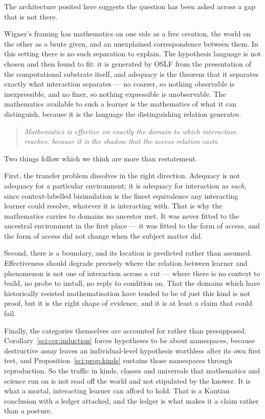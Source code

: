 The architecture posited here suggests the question has been asked across a gap that is not there.

Wigner's framing has mathematics on one side as a free creation, the world on the other as a brute
given, and an unexplained correspondence between them. In this setting there is no such separation to
explain. The hypothesis language is not chosen and then found to fit: it is generated by OSLF from the
presentation of the computational substrate itself, and adequacy is the theorem that it separates
exactly what interaction separates --- no coarser, so nothing observable is inexpressible, and no
finer, so nothing expressible is unobservable. The mathematics available to such a learner is the
mathematics of what it can distinguish, because it is the language the distinguishing relation
generates.

\begin{quote}
\itshape Mathematics is effective on exactly the domain to which interaction reaches, because it is
the shadow that the access relation casts.
\end{quote}

Two things follow which we think are more than restatement.

First, the transfer problem dissolves in the right direction. Adequacy is not adequacy for a particular
environment; it is adequacy for interaction \emph{as such}, since context-labelled bisimulation is the
finest equivalence any interacting learner could resolve, whatever it is interacting with. That is why
the mathematics carries to domains no ancestor met. It was never fitted to the ancestral environment
in the first place --- it was fitted to the form of access, and the form of access did not change when
the subject matter did.

Second, there is a boundary, and its location is predicted rather than assumed. Effectiveness should
degrade precisely where the relation between learner and phenomenon is not one of interaction across a
cut --- where there is no context to build, no probe to install, no reply to condition on. That the
domains which have historically resisted mathematisation have tended to be of just this kind is not
proof, but it is the right shape of evidence, and it is at least a claim that could fail.

Finally, the categories themselves are accounted for rather than presupposed.
Corollary~\ref{sci:cor:induction} forces hypotheses to be about namespaces, because destructive assay
leaves an individual-level hypothesis worthless after its own first test, and
Proposition~\ref{sci:prop:kinds} sustains those namespaces through reproduction. So the traffic in kinds,
classes and universals that mathematics and science run on is not read off the world and not stipulated
by the knower. It is what a mortal, interacting learner can afford to hold. That is a Kantian
conclusion with a ledger attached, and the ledger is what makes it a claim rather than a posture.

